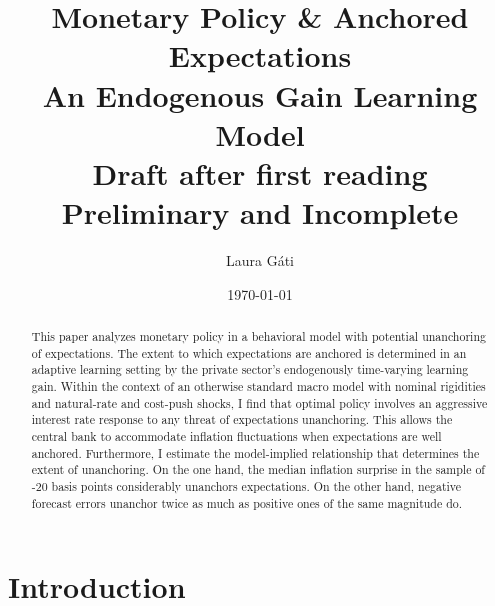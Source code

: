 \documentclass[11pt]{article}
\renewcommand{\[}{\begin{equation}}
\renewcommand{\]}{\end{equation}}
\def\movepibar{5 }
\def\movei{12 }
\begin{document}
\title{Monetary Policy \& Anchored Expectations \\
An Endogenous Gain Learning Model \\
\vspace{0.8cm}
\small{Draft after first reading \\ Preliminary and Incomplete}}
\author{Laura G\'ati} 
\date{\today}
\maketitle


\begin{abstract}
This paper analyzes monetary policy in a behavioral model with potential unanchoring of expectations. The extent to which expectations are anchored is determined in an adaptive learning setting by the private sector's endogenously time-varying learning gain. Within the context of an otherwise standard macro model with nominal rigidities and natural-rate and cost-push shocks, I find that optimal policy involves an aggressive interest rate response to any threat of expectations unanchoring. This allows the central bank to accommodate inflation fluctuations when expectations are well anchored. Furthermore, I estimate the model-implied relationship that determines the extent of unanchoring. On the one hand, the median inflation surprise in the sample of -20 basis points considerably unanchors expectations. On the other hand, negative forecast errors unanchor twice as much as positive ones of the same magnitude do. 
\end{abstract}





\newpage
\section{Introduction}\label{introduction}
\end{document}
